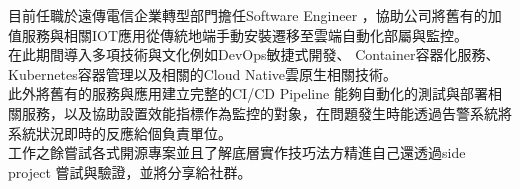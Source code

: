%
%
%
\par{
目前任職於遠傳電信企業轉型部門擔任Software Engineer ，協助公司將舊有的加值服務與相關IOT應用從傳統地端手動安裝遷移至雲端自動化部屬與監控。\\
在此期間導入多項技術與文化例如DevOps敏捷式開發、
Container容器化服務、Kubernetes容器管理以及相關的Cloud Native雲原生相關技術。\\
此外將舊有的服務與應用建立完整的CI/CD Pipeline 能夠自動化的測試與部署相關服務，以及協助設置效能指標作為監控的對象，在問題發生時能透過告警系統將系統狀況即時的反應給個負責單位。\\
工作之餘嘗試各式開源專案並且了解底層實作技巧法方精進自己還透過side project 嘗試與驗證，並將分享給社群。
}